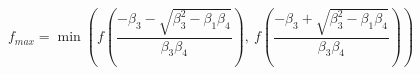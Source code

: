 

\[
f_{max} = \min \left(
f \left( \frac{-\beta_3-\sqrt{\beta_3^2-\beta_1\beta_4}}{\beta_3\beta_4} \right), \ 
f \left( \frac{-\beta_3+\sqrt{\beta_3^2-\beta_1\beta_4}}{\beta_3\beta_4} \right)
\right)
\]


